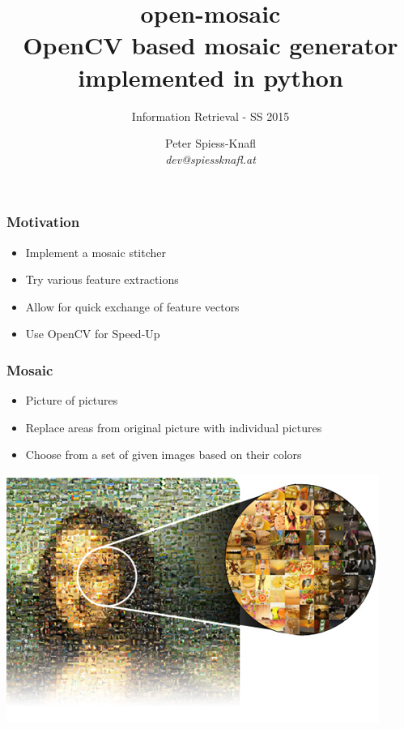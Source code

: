 \documentclass[11pt]{beamer}
\title[open-mosaic]{\textbf{open-mosaic} \\ OpenCV based mosaic generator \\ implemented in python}
\subtitle{Information Retrieval - SS 2015}
\author[Peter Spiess-Knafl]{Peter Spiess-Knafl\\ \emph{dev@spiessknafl.at}}
\date{}
\begin{document}
\maketitle

\begin{frame}
\frametitle{Motivation}
\begin{itemize}
	\item Implement a mosaic stitcher
	\item Try various feature extractions
	\item Allow for quick exchange of feature vectors
	\item Use OpenCV for Speed-Up
\end{itemize}
\end{frame}

\begin{frame}[t]
\frametitle{Mosaic}
\begin{itemize}
	\item Picture of pictures
	\item Replace areas from original picture with individual pictures
	\item Choose from a set of given images based on their colors
\end{itemize}

\includegraphics[width=\textwidth]{photo_mosaic.jpg}


\end{frame}
\end{document}
